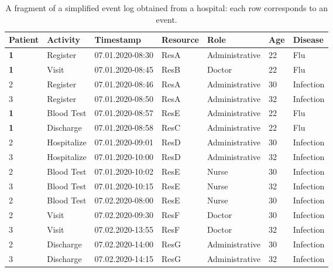 \documentclass[manuscript]{acmart}
\begin{document}
\begin{table}[tb]
\centering
\caption{A fragment of a simplified event log obtained from a hospital: each row corresponds to an event.}
\label{tab: eventLog}
\begin{tabular}{|l|l|l|l|l|l|l|} 
\hline
\textbf{Patient} & \textbf{Activity} & \textbf{Timestamp} & \textbf{Resource} & \textbf{Role}  & \textbf{Age} & \textbf{Disease} \\ 
\hline
\textbf{1}       & Register          & 07.01.2020-08:30   & ResA              & Administrative & 22           & Flu              \\
\textbf{1}       & Visit             & 07.01.2020-08:45   & ResB              & Doctor         & 22           & Flu              \\
2                & Register          & 07.01.2020-08:46   & ResA              & Administrative & 30           & Infection        \\
3                & Register          & 07.01.2020-08:50   & ResA              & Administrative & 32           & Infection        \\
\textbf{1}       & Blood Test        & 07.01.2020-08:57   & ResE              & Administrative & 22           & Flu              \\
\textbf{1}       & Discharge         & 07.01.2020-08:58   & ResC              & Administrative & 22           & Flu              \\
2                & Hospitalize       & 07.01.2020-09:01   & ResD              & Administrative & 30           & Infection        \\
3                & Hospitalize       & 07.01.2020-10:00   & ResD              & Administrative & 32           & Infection        \\
2                & Blood Test        & 07.01.2020-10:02   & ResE              & Nurse          & 30           & Infection        \\
3                & Blood Test        & 07.01.2020-10:15   & ResE              & Nurse          & 32           & Infection        \\
2                & Blood Test        & 07.02.2020-08:00   & ResE              & Nurse          & 30           & Infection        \\
2                & Visit             & 07.02.2020-09:30   & ResF              & Doctor         & 30           & Infection        \\
3                & Visit             & 07.02.2020-13:55   & ResF              & Doctor         & 32           & Infection        \\
2                & Discharge         & 07.02.2020-14:00   & ResG              & Administrative & 30           & Infection        \\
3                & Discharge         & 07.02.2020-14:15   & ResG              & Administrative & 32           & Infection        \\
\hline
\end{tabular}
\end{table}
\end{document}
